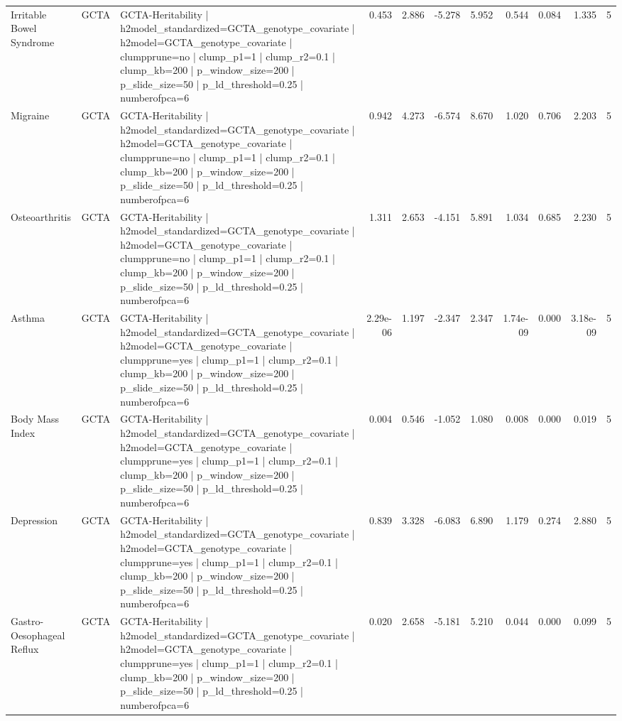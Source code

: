 \begin{landscape}
\begin{longtable}{p{2.4cm}p{1.8cm}p{6.0cm}rrrrrrrr}
Irritable Bowel Syndrome & GCTA & GCTA-Heritability | h2model\_standardized=GCTA\_genotype\_covariate | h2model=GCTA\_genotype\_covariate | clumpprune=no | clump\_p1=1 | clump\_r2=0.1 | clump\_kb=200 | p\_window\_size=200 | p\_slide\_size=50 | p\_ld\_threshold=0.25 | numberofpca=6 & 0.453 & 2.886 & -5.278 & 5.952 & 0.544 & 0.084 & 1.335 & 5 \\
Migraine & GCTA & GCTA-Heritability | h2model\_standardized=GCTA\_genotype\_covariate | h2model=GCTA\_genotype\_covariate | clumpprune=no | clump\_p1=1 | clump\_r2=0.1 | clump\_kb=200 | p\_window\_size=200 | p\_slide\_size=50 | p\_ld\_threshold=0.25 | numberofpca=6 & 0.942 & 4.273 & -6.574 & 8.670 & 1.020 & 0.706 & 2.203 & 5 \\
Osteoarthritis & GCTA & GCTA-Heritability | h2model\_standardized=GCTA\_genotype\_covariate | h2model=GCTA\_genotype\_covariate | clumpprune=no | clump\_p1=1 | clump\_r2=0.1 | clump\_kb=200 | p\_window\_size=200 | p\_slide\_size=50 | p\_ld\_threshold=0.25 | numberofpca=6 & 1.311 & 2.653 & -4.151 & 5.891 & 1.034 & 0.685 & 2.230 & 5 \\
Asthma & GCTA & GCTA-Heritability | h2model\_standardized=GCTA\_genotype\_covariate | h2model=GCTA\_genotype\_covariate | clumpprune=yes | clump\_p1=1 | clump\_r2=0.1 | clump\_kb=200 | p\_window\_size=200 | p\_slide\_size=50 | p\_ld\_threshold=0.25 | numberofpca=6 & 2.29e-06 & 1.197 & -2.347 & 2.347 & 1.74e-09 & 0.000 & 3.18e-09 & 5 \\
Body Mass Index & GCTA & GCTA-Heritability | h2model\_standardized=GCTA\_genotype\_covariate | h2model=GCTA\_genotype\_covariate | clumpprune=yes | clump\_p1=1 | clump\_r2=0.1 | clump\_kb=200 | p\_window\_size=200 | p\_slide\_size=50 | p\_ld\_threshold=0.25 | numberofpca=6 & 0.004 & 0.546 & -1.052 & 1.080 & 0.008 & 0.000 & 0.019 & 5 \\
Depression & GCTA & GCTA-Heritability | h2model\_standardized=GCTA\_genotype\_covariate | h2model=GCTA\_genotype\_covariate | clumpprune=yes | clump\_p1=1 | clump\_r2=0.1 | clump\_kb=200 | p\_window\_size=200 | p\_slide\_size=50 | p\_ld\_threshold=0.25 | numberofpca=6 & 0.839 & 3.328 & -6.083 & 6.890 & 1.179 & 0.274 & 2.880 & 5 \\
Gastro-Oesophageal Reflux & GCTA & GCTA-Heritability | h2model\_standardized=GCTA\_genotype\_covariate | h2model=GCTA\_genotype\_covariate | clumpprune=yes | clump\_p1=1 | clump\_r2=0.1 | clump\_kb=200 | p\_window\_size=200 | p\_slide\_size=50 | p\_ld\_threshold=0.25 | numberofpca=6 & 0.020 & 2.658 & -5.181 & 5.210 & 0.044 & 0.000 & 0.099 & 5 \\

\end{longtable}
\end{landscape}
